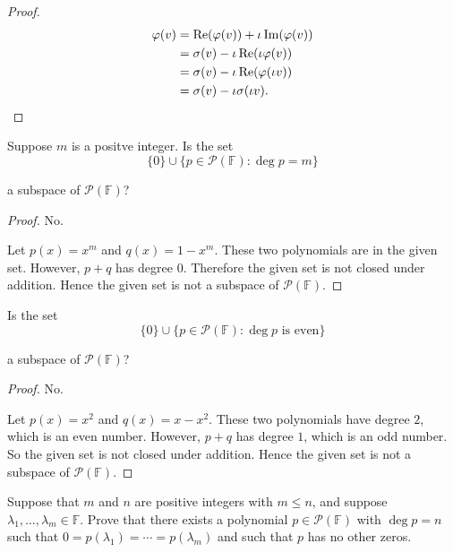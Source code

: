 \begin{proof}
    \begin{align*}
        \varphi(v) & = \operatorname{Re}(\varphi(v)) + \iota\operatorname{Im}(\varphi(v)) \\
                   & = \sigma(v) - \iota\operatorname{Re}(\iota\varphi(v))                \\
                   & = \sigma(v) - \iota\operatorname{Re}(\varphi(\iota v))               \\
                   & = \sigma(v) - \iota\sigma(\iota v).\qedhere
    \end{align*}
\end{proof}
\newpage

\begin{exercise}
    Suppose $m$ is a positve integer. Is the set
    \[
        \{0\}\cup \{ p\in\mathscr{P}(\mathbb{F}): \deg{p} = m \}
    \]

    a subspace of $\mathscr{P}(\mathbb{F})$?
\end{exercise}

\begin{proof}
    No.

    Let $p(x) = x^{m}$ and $q(x) = 1 - x^{m}$. These two polynomials are in the given set. However, $p + q$ has degree $0$. Therefore the given set is not closed under addition. Hence the given set is not a subspace of $\mathscr{P}(\mathbb{F})$.
\end{proof}
\newpage

\begin{exercise}
    Is the set
    \[
        \{0\}\cup \{ p\in\mathscr{P}(\mathbb{F}): \deg{p}\text{ is even} \}
    \]

    a subspace of $\mathscr{P}(\mathbb{F})$?
\end{exercise}

\begin{proof}
    No.

    Let $p(x) = x^{2}$ and $q(x) = x - x^{2}$. These two polynomials have degree $2$, which is an even number. However, $p + q$ has degree $1$, which is an odd number. So the given set is not closed under addition. Hence the given set is not a subspace of $\mathscr{P}(\mathbb{F})$.
\end{proof}
\newpage

\begin{exercise}
    Suppose that $m$ and $n$ are positive integers with $m \leq n$, and suppose $\lambda_{1} , \ldots, \lambda_{m} \in \mathbb{F}$. Prove that there exists a polynomial $p \in \mathscr{P}(\mathbb{F})$ with $\deg{p} = n$ such that $0 = p(\lambda_{1}) = \cdots = p(\lambda_{m})$ and such that $p$ has no other zeros.
\end{exercise}

